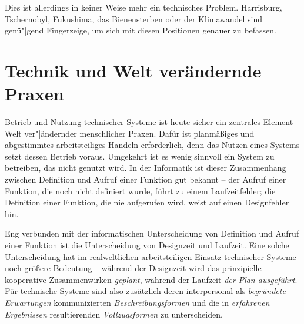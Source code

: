 \documentclass[11pt,a4paper]{article}
\begin{document}
Dies ist allerdings in keiner Weise mehr ein technisches Problem.  Harrisburg,
Tschernobyl, Fukushima, das Bienensterben \cite{Jacobasch2019} oder der
Klimawandel sind genü"|gend Fingerzeige, um sich mit diesen Positionen genauer
zu befassen.

\section{Technik und Welt verändernde Praxen}

Betrieb und Nutzung technischer Systeme ist heute sicher ein zentrales Element
Welt ver"|ändernder menschlicher Praxen. Dafür ist planmäßiges und abgestimmtes
arbeitsteiliges Handeln erforderlich, denn das Nutzen eines Systems setzt
dessen Betrieb voraus.  Umgekehrt ist es wenig sinnvoll ein System zu
betreiben, das nicht genutzt wird. In der Informatik ist dieser Zusammenhang
zwischen Definition und Aufruf einer Funktion gut bekannt -- der Aufruf einer
Funktion, die noch nicht definiert wurde, führt zu einem Laufzeitfehler; die
Definition einer Funktion, die nie aufgerufen wird, weist auf einen
Designfehler hin.

Eng verbunden mit der informatischen Unterscheidung von Definition und Aufruf
einer Funktion ist die Unterscheidung von Designzeit und Laufzeit.  Eine
solche Unterscheidung hat im realweltlichen arbeitsteiligen Einsatz
technischer Systeme noch größere Bedeutung -- während der Designzeit wird das
prinzipielle kooperative Zusammenwirken \emph{geplant}, während der Laufzeit
\emph{der Plan ausgeführt}. Für technische Systeme sind also zusätzlich deren
interpersonal als \emph{begründete Erwartungen} kommunizierten
\emph{Beschreibungsformen} und die in \emph{erfahrenen Ergebnissen}
resultierenden \emph{Vollzugsformen} zu unterscheiden.
\end{document}
